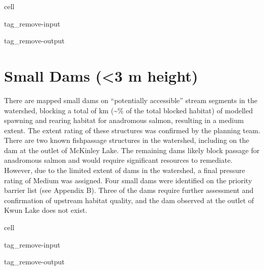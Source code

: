 \documentclass[letterpaper,10pt,english]{jupyterBook}
\begin{document}
\begin{sphinxuseclass}{cell}
\begin{sphinxuseclass}{tag_remove-input}
\begin{sphinxuseclass}{tag_remove-output}
\end{sphinxuseclass}
\end{sphinxuseclass}
\end{sphinxuseclass}

\section{Small Dams (<3 m height)}
\label{\detokenize{EcoAttributes:small-dams-3-m-height}}
\sphinxAtStartPar
There are  mapped small dams on “potentially accessible” stream segments in the watershed, blocking a total of  km (\textasciitilde{}\% of the total blocked habitat) of modelled spawning and rearing habitat for anadromous salmon, resulting in a medium extent. The extent rating of these structures was confirmed by the planning team. There are two known fish\sphinxhyphen{}passage structures in the watershed, including on the dam at the outlet of McKinley Lake. The remaining dams likely block passage for anadromous salmon and would require significant resources to remediate. However, due to the limited extent of dams in the watershed, a final pressure rating of Medium was assigned. Four small dams were identified on the priority barrier list (see Appendix B). Three of the dams require further assessment and confirmation of upstream habitat quality, and the dam observed at the outlet of Kwun Lake does not exist.

\begin{sphinxuseclass}{cell}
\begin{sphinxuseclass}{tag_remove-input}
\begin{sphinxuseclass}{tag_remove-output}
\end{sphinxuseclass}
\end{sphinxuseclass}
\end{sphinxuseclass}
\end{document}
